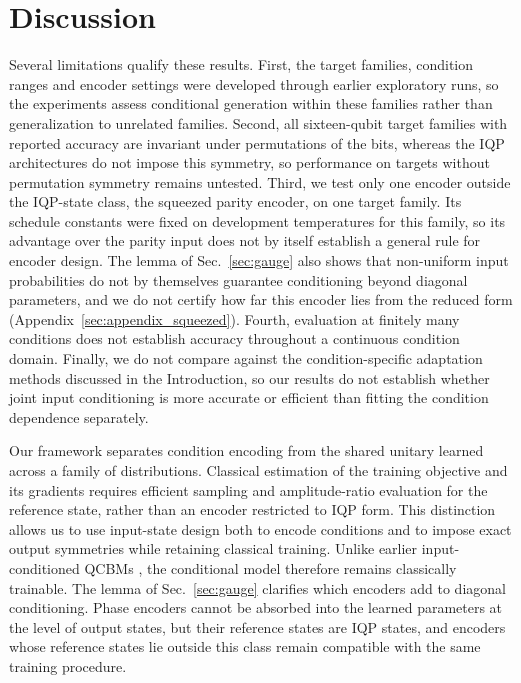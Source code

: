 \documentclass[pra,aps,10pt,twocolumn,floatfix,superscriptaddress, notitlepage,longbibliography]{revtex4-2}
\begin{document}
\section{Discussion}
\label{sec:discussion}

Several limitations qualify these results. First, the target families, condition ranges and encoder settings were developed through earlier exploratory runs, so the experiments assess conditional generation within these families rather than generalization to unrelated families. Second, all sixteen-qubit target families with reported accuracy are invariant under permutations of the bits, whereas the IQP architectures do not impose this symmetry, so performance on targets without permutation symmetry remains untested. Third, we test only one encoder outside the IQP-state class, the squeezed parity encoder, on one target family. Its schedule constants were fixed on development temperatures for this family, so its advantage over the parity input does not by itself establish a general rule for encoder design. The lemma of Sec.~\ref{sec:gauge} also shows that non-uniform input probabilities do not by themselves guarantee conditioning beyond diagonal parameters, and we do not certify how far this encoder lies from the reduced form (Appendix~\ref{sec:appendix_squeezed}). Fourth, evaluation at finitely many conditions does not establish accuracy throughout a continuous condition domain. Finally, we do not compare against the condition-specific adaptation methods discussed in the Introduction, so our results do not establish whether joint input conditioning is more accurate or efficient than fitting the condition dependence separately.

Our framework separates condition encoding from the shared unitary learned across a family of distributions. Classical estimation of the training objective and its gradients requires efficient sampling and amplitude-ratio evaluation for the reference state, rather than an encoder restricted to IQP form. This distinction allows us to use input-state design both to encode conditions and to impose exact output symmetries while retaining classical training. Unlike earlier input-conditioned QCBMs \cite{kissConditionalBornMachine2022}, the conditional model therefore remains classically trainable. The lemma of Sec.~\ref{sec:gauge} clarifies which encoders add to diagonal conditioning. Phase encoders cannot be absorbed into the learned parameters at the level of output states, but their reference states are IQP states, and encoders whose reference states lie outside this class remain compatible with the same training procedure.
\end{document}
